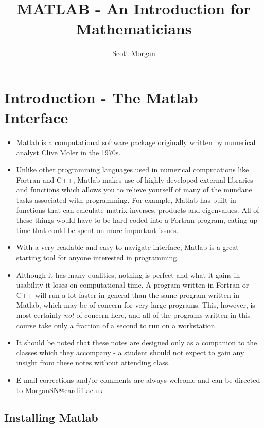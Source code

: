 \documentclass[12pt]{report}
\title{MATLAB - An Introduction for Mathematicians}
\author{Scott Morgan}
\begin{document}
\maketitle

\section*{Introduction - The Matlab Interface}

\begin{itemize}
\item Matlab is a computational software package originally written by numerical analyst Clive Moler in the 1970s. 
\item Unlike other programming languages used in numerical computations like Fortran and C++, Matlab makes use of highly developed external libraries and functions which allows you to relieve yourself of many of the mundane tasks associated with programming. For example, Matlab has built in functions that can calculate matrix inverses, products and eigenvalues. All of these things would have to be hard-coded into a Fortran program, eating up time that could be spent on more important issues. 
\item With a very readable and easy to navigate interface, Matlab is a great starting tool for anyone interested in programming. 
\item Although it has many qualities, nothing is perfect and what it gains in usability it loses on computational time. A program written in Fortran or C++ will run a lot faster in general than the same program written in Matlab, which may be of concern for very large programs. This, however, is most certainly \textit{not} of concern here, and all of the programs written in this course take only a fraction of a second to run on a workstation.
\item It should be noted that these notes are designed only as a companion to the classes which they accompany - a student should not expect to gain any insight from these notes without attending class.
\item E-mail corrections and/or comments are always welcome and can be directed to \url{MorganSN@cardiff.ac.uk}
\end{itemize}


\subsection*{Installing Matlab}
\end{document}
